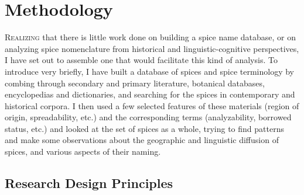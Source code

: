 

\chapter{Methodology}
\label{ch:methodology}


\lettrine[lines=\iniciale]{\textcolor{\accentcolor}{R}}{ealizing} that there is little work done on building a spice name database, or on analyzing spice nomenclature from historical and linguistic-cognitive perspectives, I have set out to assemble one that would facilitate this kind of analysis. 
To introduce very briefly, I have built a database of spices and spice terminology by combing through secondary and primary literature, botanical databases, encyclopedias and dictionaries, and searching for the spices in contemporary and historical corpora. I then used a few selected features of these materials (region of origin, spreadability, etc.) and the corresponding terms (analyzability, borrowed status, etc.) and looked at the set of spices as a whole, trying to find patterns and make some observations about the geographic and linguistic diffusion of spices, and various aspects of their naming.


\section{Research Design Principles}


